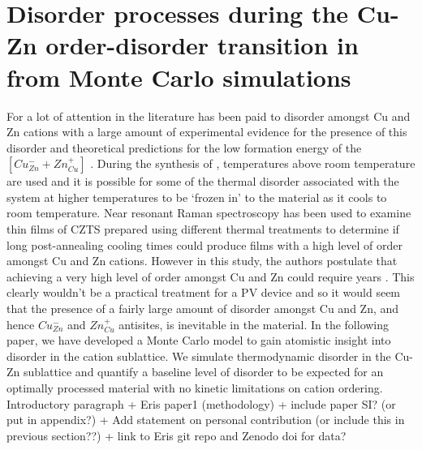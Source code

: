 \documentclass[11pt, twoside]{report}
\begin{document}
\section{Disorder processes during the Cu-Zn order-disorder transition in {\CZTS} from Monte Carlo simulations}\label{CZTS_MC}
For {\CZTS} a lot of attention in the literature has been paid to disorder amongst Cu and Zn cations with a large amount of experimental evidence for the presence of this disorder \cite{Schorr, CZTS_Xray, CZTS_TEM} and theoretical predictions for the low formation energy of the  $[Cu_{Zn}^{-} + Zn_{Cu}^{+}]$ \cite{defects_Chen}.
During the synthesis of {\CZTS}, temperatures above room temperature are used and it is possible for some of the thermal disorder associated with the system at higher temperatures to be `frozen in' to the material as it cools to room temperature.
Near resonant Raman spectroscopy has been used to examine thin films of CZTS prepared using different thermal treatments to determine if long post-annealing cooling times could produce films with a high level of order amongst Cu and Zn cations. However in this study, the authors postulate that achieving a very high level of order amongst Cu and Zn could require years \cite{Katharina}. This clearly wouldn't be a practical treatment for a PV device and so it would seem that the presence of a fairly large amount of disorder amongst Cu and Zn, and hence $Cu_{Zn}^{-}$ and $Zn_{Cu}^{+}$ antisites,  is inevitable in the material. In the following paper, we have developed a Monte Carlo model to gain atomistic insight into disorder in the cation sublattice. We simulate thermodynamic disorder in the Cu-Zn sublattice and quantify a baseline level of disorder to be expected for an optimally processed material with no kinetic limitations on cation ordering.\\

Introductory paragraph + Eris paper1 (methodology) + include paper SI? (or put in appendix?) + Add statement on personal contribution (or include this in previous section??) + link to Eris git repo and Zenodo doi for data?





\end{document}
